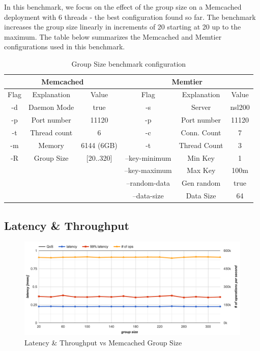 In this benchmark, we focus on the effect of the group size on a Memcached deployment with 6 threads - the best configuration found so far. The benchmark increases the group size linearly in increments of 20 starting at 20 up to the maximum. The table below summarizes the Memcached and Memtier configurations used in this benchmark.

\begin{table}[h!]
\centering
\begin{tabular}{| c c c | c c c |}
 \hline
 \multicolumn{3}{|c|}{Memcached} & \multicolumn{3}{|c|}{Memtier} \\
 \hline
 Flag & Explanation & Value & Flag & Explanation & Value \\ [0.5ex]
 \hline\hline

 -d & Daemon Mode & true        & -s & Server & nsl200 \\
 -p & Port number & 11120       & -p & Port number & 11120 \\
 -t & Thread count & 6          & -c & Conn. Count & 7 \\
 -m & Memory & 6144 (6GB)       & -t & Thread Count & 3 \\
 -R & Group Size & [20..320]    & --key-minimum & Min Key & 1 \\
 & &                            & --key-maximum & Max Key & 100m \\
 & &                            & --random-data & Gen random & true \\
 & &                            & --data-size & Data Size & 64 \\

 \hline

\end{tabular}
\caption{Group Size benchmark configuration}
\label{tab:m_threads_memcached}
\end{table}


\subsection{Latency \& Throughput}

\begin{figure}[h]
    \includegraphics[width=\textwidth]{./res2/m_group_size_latency.png}
    \caption{Latency \& Throughput vs Memcached Group Size }
    \label{fig:m_group_size_latency}
\end{figure}


